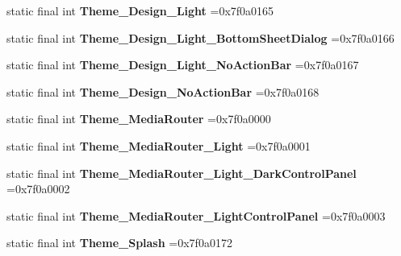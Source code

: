 \begin{DoxyCompactItemize}
static final int {\bfseries Theme\+\_\+\+Design\+\_\+\+Light} =0x7f0a0165
\item 
\mbox{\label{classproject4_1_1xaria_1_1R_1_1style_a4c949da0c4700e9edc8244bb7e5ad607}} 
static final int {\bfseries Theme\+\_\+\+Design\+\_\+\+Light\+\_\+\+Bottom\+Sheet\+Dialog} =0x7f0a0166
\item 
\mbox{\label{classproject4_1_1xaria_1_1R_1_1style_a854208a2306cf05baa3f7519a8ed9760}} 
static final int {\bfseries Theme\+\_\+\+Design\+\_\+\+Light\+\_\+\+No\+Action\+Bar} =0x7f0a0167
\item 
\mbox{\label{classproject4_1_1xaria_1_1R_1_1style_a6ce19244e44f15fb7b6d14e0430204f2}} 
static final int {\bfseries Theme\+\_\+\+Design\+\_\+\+No\+Action\+Bar} =0x7f0a0168
\item 
\mbox{\label{classproject4_1_1xaria_1_1R_1_1style_ae6ca7dc9a393e8baf90cc9d7df09c5fe}} 
static final int {\bfseries Theme\+\_\+\+Media\+Router} =0x7f0a0000
\item 
\mbox{\label{classproject4_1_1xaria_1_1R_1_1style_a8d8e36ced288729457c6168c77b1b21c}} 
static final int {\bfseries Theme\+\_\+\+Media\+Router\+\_\+\+Light} =0x7f0a0001
\item 
\mbox{\label{classproject4_1_1xaria_1_1R_1_1style_a3768eba0c58dbb5bcc04d775a4e4b299}} 
static final int {\bfseries Theme\+\_\+\+Media\+Router\+\_\+\+Light\+\_\+\+Dark\+Control\+Panel} =0x7f0a0002
\item 
\mbox{\label{classproject4_1_1xaria_1_1R_1_1style_a71e2885166ee01d6a40ee6a7fb0fc8b0}} 
static final int {\bfseries Theme\+\_\+\+Media\+Router\+\_\+\+Light\+Control\+Panel} =0x7f0a0003
\item 
\mbox{\label{classproject4_1_1xaria_1_1R_1_1style_a7abefd644ae617ce23630213a3945f22}} 
static final int {\bfseries Theme\+\_\+\+Splash} =0x7f0a0172
\item 
\mbox{\label{classproject4_1_1xaria_1_1R_1_1style_ac73e849fbe2cff9219d50c2544de88d1}} 

\end{DoxyCompactItemize}

